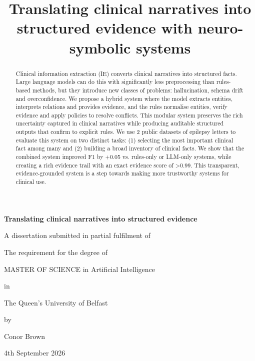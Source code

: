 \documentclass[conference]{IEEEtran}
\begin{document}
\begin{titlepage}
    \centering

    {\Huge\bfseries Translating clinical narratives into structured evidence\par}
    \vspace{2cm}

    {\large
    A dissertation submitted in partial fulfilment of\par
    The requirement for the degree of\par
    MASTER OF SCIENCE in Artificial Intelligence\par
    in\par
    The Queen’s University of Belfast\par
    by\par
    Conor Brown\par
    4th September 2026
    }
\end{titlepage}


\title{Translating clinical narratives into structured evidence with neuro-symbolic systems\\}



\maketitle

\begin{abstract}
Clinical information extraction (IE) converts clinical 
narratives into structured facts. Large language models can 
do this with significantly less preprocessing than rules-based 
methods, but they introduce new classes of problems: 
hallucination, schema drift and overconfidence. We propose 
a hybrid system where the model extracts entities, interprets 
relations and provides evidence, and the rules normalise 
entities, verify evidence and apply policies to resolve conflicts. 
This modular system preserves the rich uncertainty captured 
in clinical narratives while producing auditable structured 
outputs that confirm to explicit rules. We use 2 public datasets 
of epilepsy letters to evaluate this system on two distinct tasks: 
(1) selecting the most important clinical fact among many and 
(2) building a broad inventory of clinical facts. We show that 
the combined system improved F1 by +0.05 vs. rules-only or 
LLM-only systems, while creating a rich evidence trail with an 
exact evidence score of >0.99. This transparent, 
evidence-grounded system is a step towards making more 
trustworthy systems for clinical use.
\end{abstract}
\end{document}

